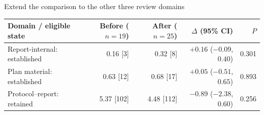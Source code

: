 \documentclass[10pt,aspectratio=169]{beamer}
\begin{document}
\begin{frame}[t]{Extend the comparison to the other three review domains}
\small
\begin{tabularx}{\linewidth}{@{}Yrrrr@{}}
\toprule
Domain / eligible state & Before ($n=19$) & After ($n=25$) & $\Delta$ (95\% CI) & $P$ \\
\midrule
Report-internal: established & 0.16 [3] & 0.32 [8] & $+0.16$ ($-0.09$, $0.40$) & 0.301 \\
Plan material: established & 0.63 [12] & 0.68 [17] & $+0.05$ ($-0.51$, $0.65$) & 0.893 \\
Protocol--report: retained & 5.37 [102] & 4.48 [112] & $-0.89$ ($-2.38$, $0.60$) & 0.256 \\
\bottomrule
\end{tabularx}


\end{frame}
\end{document}

